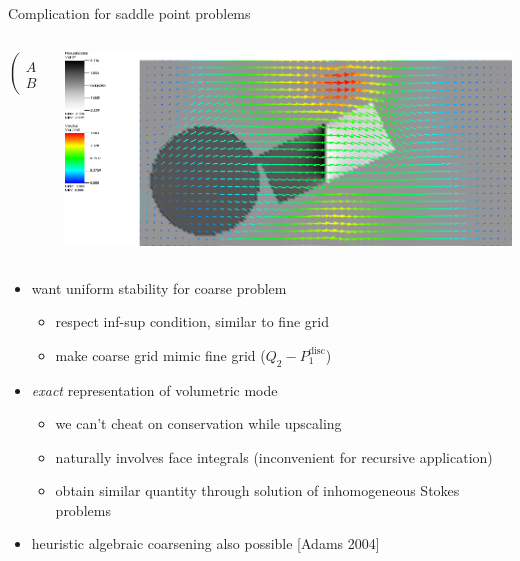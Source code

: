 \begin{frame}{Complication for saddle point problems}
  \begin{columns}
    \begin{column}{0.2\textwidth}
      \[ \begin{pmatrix}
        A & B^T \\ B & 0
      \end{pmatrix} \]
    \end{column}
    \begin{column}{0.8\textwidth}
      \includegraphics[width=\textwidth]{figures/MG/StokesDualProblem}
    \end{column}
  \end{columns}
  \begin{itemize}
  \item want uniform stability for coarse problem
    \begin{itemize}
    \item respect inf-sup condition, similar to fine grid
    \item make coarse grid mimic fine grid ($Q_2-P_1^{\text{disc}}$)
    \end{itemize}
  \item \emph{exact} representation of volumetric mode
    \begin{itemize}
    \item we can't cheat on conservation while upscaling
    \item naturally involves face integrals (inconvenient for recursive application)
    \item obtain similar quantity through solution of inhomogeneous Stokes problems
    \end{itemize}
  \item heuristic algebraic coarsening also possible [Adams 2004]
  \end{itemize}
\end{frame}
